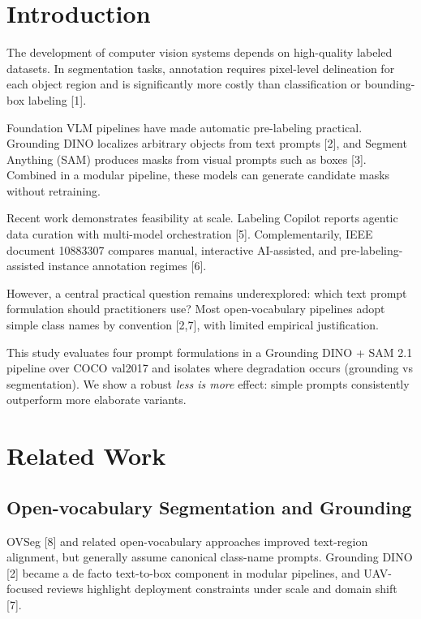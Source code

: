 \documentclass[pdflatex,sn-mathphys-num]{sn-jnl}
\begin{document}
\section{Introduction}

The development of computer vision systems depends on high-quality labeled datasets. In segmentation tasks, annotation requires pixel-level delineation for each object region and is significantly more costly than classification or bounding-box labeling [1].

Foundation VLM pipelines have made automatic pre-labeling practical. Grounding DINO localizes arbitrary objects from text prompts [2], and Segment Anything (SAM) produces masks from visual prompts such as boxes [3]. Combined in a modular pipeline, these models can generate candidate masks without retraining.

Recent work demonstrates feasibility at scale. Labeling Copilot reports agentic data curation with multi-model orchestration [5]. Complementarily, IEEE document 10883307 compares manual, interactive AI-assisted, and pre-labeling-assisted instance annotation regimes [6].

However, a central practical question remains underexplored: which text prompt formulation should practitioners use? Most open-vocabulary pipelines adopt simple class names by convention [2,7], with limited empirical justification.

This study evaluates four prompt formulations in a Grounding DINO + SAM 2.1 pipeline over COCO val2017 and isolates where degradation occurs (grounding vs segmentation). We show a robust \emph{less is more} effect: simple prompts consistently outperform more elaborate variants.

\section{Related Work}

\subsection{Open-vocabulary Segmentation and Grounding}

OVSeg [8] and related open-vocabulary approaches improved text-region alignment, but generally assume canonical class-name prompts. Grounding DINO [2] became a de facto text-to-box component in modular pipelines, and UAV-focused reviews highlight deployment constraints under scale and domain shift [7].
\end{document}

